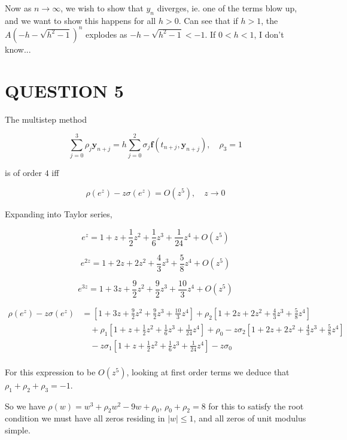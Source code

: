 \documentclass[a4paper]{article}
\begin{document}
Now as $ n \to \infty $, we wish to show that $ y_{n} $ diverges, ie. one of the terms blow up, and we want to show this happens for all $ h > 0 $. Can see that if $ h > 1 $, the $ A \left(   -h  - \sqrt{h^{2} - 1} \right)^{n} $ explodes as $ -h  - \sqrt{h^{2} - 1} < - 1 $. If $ 0 < h < 1 $, I don't know...







\section{QUESTION 5}

The multistep method

\[ \sum_{j=0}^{3} \rho_{j} \mathbf{y}_{n+j} = h \sum_{j=0}^{2} \sigma_{j} \mathbf{f}(t_{n+j}, \mathbf{y}_{n+j} ), \quad \rho_{3} = 1 \]

is of order $ 4 $ iff

\[ \rho(e^{z}) - z \sigma(e^{z}) = O(z^{5}), \quad z \to 0 \]

Expanding into Taylor series,


\[ e^{z} = 1 + z + \frac{1}{2} z^{2} + \frac{1}{6} z^{3} + \frac{1}{24} z^{4} + O(z^{5}) \]

\[ e^{2z} = 1 + 2z + 2z^{2} + \frac{4}{3} z^{3} + \frac{5}{8} z^{4} + O(z^{5})  \]

\[ e^{3z} = 1 + 3z + \frac{9}{2} z^{2} + \frac{9}{2} z^{3} + \frac{10}{3} z^{4} + O(z^{5})    \]

\begin{align*}
\rho(e^{z}) - z \sigma(e^{z}) & = [1 + 3z + \frac{9}{2} z^{2} + \frac{9}{2} z^{3} + \frac{10}{3} z^{4}] + \rho_{2} [1 + 2z + 2z^{2} + \frac{4}{3} z^{3} + \frac{5}{8} z^{4}] \\
& \quad + \rho_{1} [1 + z + \frac{1}{2} z^{2} + \frac{1}{6} z^{3} + \frac{1}{24} z^{4}] + \rho_{0} - z \sigma_{2} \left[  1 + 2z + 2z^{2} + \frac{4}{3} z^{3} + \frac{5}{8} z^{4} \right]    \\
& \quad - z \sigma_{1} \left[  1 + z + \frac{1}{2} z^{2} + \frac{1}{6} z^{3} + \frac{1}{24} z^{4} \right]  - z \sigma_{0} \\
\end{align*}

For this expression to be $ O(z^{5}) $, looking at first order terms we deduce that $ \rho_{1} + \rho_{2} + \rho_{3} = - 1 $. 

So we have $ \rho(w) = w^{3} + \rho_{2} w^{2} - 9 w + \rho_{0} $, $ \rho_{0} + \rho_{2} = 8 $ for this to satisfy the root condition we must have all zeros residing in $ | w | \leq 1 $, and all zeros of unit modulus simple. 
\end{document}
